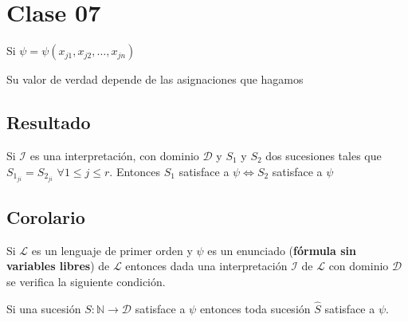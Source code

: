 \section{Clase 07}

Si $\psi = \psi(x_{j1}, x_{j2}, \ldots, x_{jn})$

Su valor de verdad depende de las asignaciones que hagamos

\subsection{Resultado}

Si $\mathcal{I}$ es una interpretaci\'on, con dominio $\mathcal{D}$ y $S_1$ y $S_2$ dos sucesiones tales que $S_{1_{ji}} = S_{2_{ji}}$ $\forall 1 \leq j \leq r$. Entonces $S_1$ satisface a $\psi \iff S_2$ satisface a $\psi$

\subsection{Corolario}

Si $\mathcal{L}$ es un lenguaje de primer orden y $\psi$ es un enunciado (\textbf{f\'ormula sin variables libres}) de $\mathcal{L}$ entonces dada una interpretaci\'on $\mathcal{I}$ de $\mathcal{L}$ con dominio $\mathcal{D}$ se verifica la siguiente condici\'on.

Si una sucesi\'on $S : \mathbb{N} \to \mathcal{D}$ satisface a $\psi$ entonces toda sucesi\'on $\hat{S}$ satisface a $\psi$.

